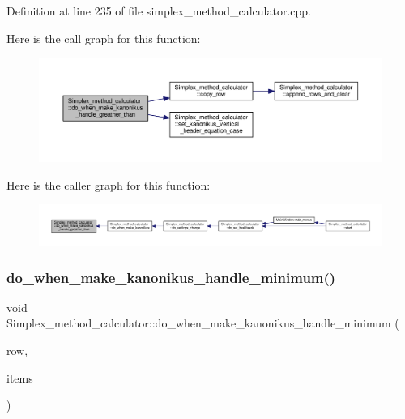 Definition at line 235 of file simplex\+\_\+method\+\_\+calculator.\+cpp.

Here is the call graph for this function\+:\nopagebreak
\begin{figure}[H]
\begin{center}
\leavevmode
\includegraphics[width=350pt]{classSimplex__method__calculator_abe265923af8974d3e865d22bcae47b7b_cgraph}
\end{center}
\end{figure}
Here is the caller graph for this function\+:\nopagebreak
\begin{figure}[H]
\begin{center}
\leavevmode
\includegraphics[width=350pt]{classSimplex__method__calculator_abe265923af8974d3e865d22bcae47b7b_icgraph}
\end{center}
\end{figure}
\mbox{\label{classSimplex__method__calculator_a61d301b932d1206f967048888c292d4b}} 
\subsubsection{\texorpdfstring{do\+\_\+when\+\_\+make\+\_\+kanonikus\+\_\+handle\+\_\+minimum()}{do\_when\_make\_kanonikus\_handle\_minimum()}}
{\footnotesize\ttfamily void Simplex\+\_\+method\+\_\+calculator\+::do\+\_\+when\+\_\+make\+\_\+kanonikus\+\_\+handle\+\_\+minimum (\begin{DoxyParamCaption}\item[{int}]{row,  }\item[{Q\+List$<$ Q\+Standard\+Item $\ast$$>$}]{items }\end{DoxyParamCaption})\hspace{0.3cm}{\ttfamily [private]}}




